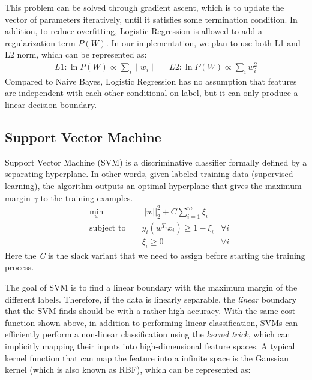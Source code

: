 \documentclass{article} %
\begin{document}
This problem can be solved through gradient ascent, which is to update the vector of parameters iteratively, until it satisfies some termination condition. In addition, to reduce overfitting, Logistic Regression is allowed to add a regularization term $P(W)$. In our implementation, we plan to use both L1 and L2 norm, which can be represented as:
\begin{equation}
\begin{aligned}
L1: \ln P(W) \propto \sum_i \mid w_i \mid && L2: \ln P(W) \propto \sum_i w^2_i
\end{aligned}
\end{equation}
Compared to Naive Bayes, Logistic Regression has no assumption that features are independent with each other conditional on label, but it can only produce a linear decision boundary.


\subsection{Support Vector Machine}
Support Vector Machine (SVM) is a discriminative classifier formally defined by a separating hyperplane. In other words, given labeled training data (supervised learning), the algorithm outputs an optimal hyperplane that gives the maximum margin $\gamma$ to the training examples.
\begin{equation}
\begin{aligned}
&\underset{w}{\min}&&||w||^2_2 + C\sum\limits_{i=1}^m\xi_i\\
&\text{subject to } &&y_i(w^{T_i}x_i) \geq 1-\xi_i &\forall i\\
&&&\xi_i\geq 0 &\forall i
\end{aligned}
\end{equation}
Here the \emph{C} is the slack variant that we need to assign before starting the training process.

The goal of SVM is to find a linear boundary with the maximum margin of the different labels. Therefore, if the data is linearly separable, the \emph{linear} boundary that the SVM finds should be with a rather high accuracy. With the same cost function shown above, in addition to performing linear classification, SVMs can efficiently perform a non-linear classification using the \emph{kernel trick}, which can implicitly mapping their inputs into high-dimensional feature spaces. A typical kernel function that can map the feature into a infinite space is the Gaussian kernel (which is also known as RBF), which can be represented as:
\end{document}
